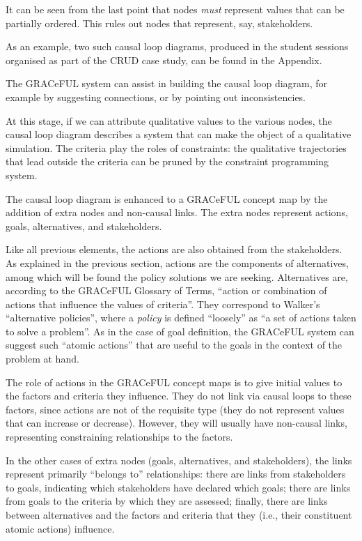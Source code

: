 \documentclass[]{article}
\begin{document}
It can be seen from the last point that nodes \emph{must} represent
values that can be partially ordered. This rules out nodes that
represent, say, stakeholders.

As an example, two such causal loop diagrams, produced in the
student sessions organised as part of the CRUD case study, can be
found in the Appendix.

The GRACeFUL system can assist in building the causal loop diagram, for
example by suggesting connections, or by pointing out inconsistencies.

At this stage, if we can attribute qualitative values to the various
nodes, the causal loop diagram describes a system that can make the
object of a qualitative simulation. The criteria play the roles of
constraints: the qualitative trajectories that lead outside the criteria
can be pruned by the constraint programming system.

The causal loop diagram is enhanced to a GRACeFUL concept map by the
addition of extra nodes and non-causal links. The extra nodes represent
actions, goals, alternatives, and stakeholders.

Like all previous elements, the actions are also obtained from the
stakeholders. As explained in the previous section, actions are the
components of alternatives, among which will be found the policy
solutions we are seeking. Alternatives are, according to the GRACeFUL
Glossary of Terms, ``action or combination of actions that influence the
values of criteria''. They correspond to Walker's ``alternative
policies'', where a \emph{policy} is defined ``loosely'' as ``a set of
actions taken to solve a problem''. As in the case of goal definition,
the GRACeFUL system can suggest such ``atomic actions'' that are useful
to the goals in the context of the problem at hand.

The role of actions in the GRACeFUL concept maps is to give initial
values to the factors and criteria they influence. They do not link via
causal loops to these factors, since actions are not of the requisite
type (they do not represent values that can increase or decrease).
However, they will usually have non-causal links, representing
constraining relationships to the factors.

In the other cases of extra nodes (goals, alternatives, and
stakeholders), the links represent primarily ``belongs to''
relationships: there are links from stakeholders to goals, indicating
which stakeholders have declared which goals; there are links from goals
to the criteria by which they are assessed; finally, there are links
between alternatives and the factors and criteria that they (i.e., their
constituent atomic actions) influence.
\end{document}
